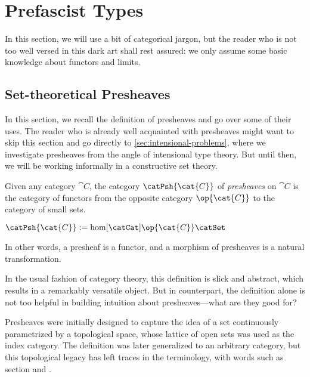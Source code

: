 \setchapterpreamble[u]{\margintoc}
\chapter{Prefascist Types}


In this section, we will use a bit of categorical jargon, but the reader
who is not too well versed in this dark art shall rest assured:
we only assume some basic knowledge about functors and limits.

\section{Set-theoretical Presheaves}\label{sec:categorical-reminders}

In this section, we recall the definition of presheaves and go 
over some of their uses.
% 
The reader who is already well acquainted with presheaves might want to skip
this section and go directly to \cref{sec:intensional-problems}, where we
investigate presheaves from the angle of intensional type theory.
% 
But until then, we will be working informally in a constructive set theory.

Given any category \( \cat{C} \), the category 
\( \catPsh{\cat{C}} \) of \emph{presheaves} on \( \cat{C} \) is the category 
of functors from the opposite category \( \op{\cat{C}} \) to the category of 
small sets.
\begin{definition}
\(
    \catPsh{\cat{C}} := \hom[\catCat]{\op{\cat{C}}}{\catSet}
\)
\end{definition}
In other words, a presheaf is a functor, and a morphism of presheaves is a 
natural transformation.

In the usual fashion of category theory, this definition is slick
and abstract, which results in a remarkably versatile object. 
% 
But in counterpart, the definition alone is not too helpful in building
intuition about presheaves---what are they good for?

Presheaves were initially designed to capture the 
idea of a set continuously parametrized by a topological space, whose lattice 
of open sets was used as the index category. 
% 
The definition was later generalized to an arbitrary category, but this 
topological legacy has left traces in the terminology, with words such as 
{\color{defcolor} section} and .

